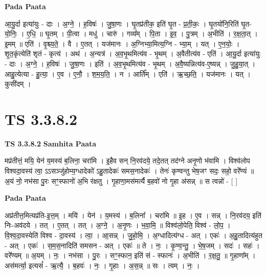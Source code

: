 \documentclass[17pt]{extarticle}
\begin{document}
\textbf{Pada Paata} \newline

आ॒यु॒र्दा इत्या॑युः - दाः । अ॒ग्ने॒ । ह॒विषः॑ । जु॒षा॒णः । घृ॒तप्र॑तीक॒ इति॑ घृ॒त - प्र॒ती॒कः॒ । घृ॒तयो॑नि॒रिति॑ घृ॒त-यो॒निः॒ । ए॒धि॒ ॥ घृ॒तम् । पी॒त्वा । मधु॑ । चारु॑ । गव्य᳚म् । पि॒ता । इ॒व॒ । पु॒त्रम् । अ॒भीति॑ । र॒क्ष॒ता॒त् । इ॒मम् ॥ एति॑ । वृ॒श्च्य॒ते॒ । वै । ए॒तत् । यज॑मानः । अ॒ग्निभ्या॒मित्य॒ग्नि - भ्या॒म् । यत् । ए॒न॒योः॒ । शृ॒त॒कृंत्येति॑ शृतं - कृत्य॑ । अथ॑ । अ॒न्यत्र॑ । अ॒व॒भृ॒थमित्य॑व - भृ॒थम् । अ॒वैतीत्य॑व - एति॑ । आ॒यु॒र्दा इत्या॑युः - दाः । अ॒ग्ने॒ । ह॒विषः॑ । जु॒षा॒णः । इति॑ । अ॒व॒भृ॒थमित्य॑व - भृ॒थम् । अ॒वै॒ष्यन्नित्य॑व-ए॒ष्यन्न् । जु॒हु॒या॒त् । आहु॒त्येत्या - हु॒त्या॒ । ए॒व । ए॒नौ॒ । श॒म॒य॒ति॒ । न । आर्ति᳚म् । एति॑ । ऋ॒च्छ॒ति॒ । यज॑मानः । यत् । कुसी॑दम् ।  \newline





\section{ TS 3.3.8.2 }

\textbf{TS 3.3.8.2 } \newline
\textbf{Samhita Paata} \newline

मप्र॑तीत्तं॒ मयि॒ येन॑ य॒मस्य॑ ब॒लिना॒ चरा॑मि । इ॒हैव सन् नि॒रव॑दये॒ तदे॒तत् तद॑ग्ने अनृ॒णो भ॑वामि । विश्व॑लोप विश्वदा॒वस्य॑ त्वा॒ ऽऽसञ्जु॑होम्य॒ग्धादेको॑ ऽहु॒तादेकः॑ समस॒नादेकः॑ । तेनः॑ कृण्वन्तु भेष॒जꣳ सदः॒ सहो॒ वरे᳚ण्यं ॥ अ॒यं नो॒ नभ॑सा पु॒रः सꣳ॒॒स्फानो॑ अ॒भि र॑क्षतु । गृ॒हाणा॒मस॑मर्त्यै ब॒हवो॑ नो गृ॒हा अ॑सन्न् ॥ स त्वन्नो॑ - [  ] \newline

\textbf{Pada Paata} \newline

अप्र॑तीत्त॒मित्यप्र॑ति-इ॒त्त॒म् । मयि॑ । येन॑ । य॒मस्य॑ । ब॒लिना᳚ । चरा॑मि ॥ इ॒ह । ए॒व । सन्न् । नि॒रव॑दय॒ इति॑ निः-अव॑दये । तत् । ए॒तत् । तत् । अ॒ग्ने॒ । अ॒नृ॒णः । भ॒वा॒मि॒ ॥ विश्व॑लो॒पेति॒ विश्व॑ - लो॒प॒ । वि॒श्व॒दा॒वस्येति॑ विश्व - दा॒वस्य॑ । त्वा॒ । आ॒सन्न् । जु॒हो॒मि॒ । अ॒ग्धादित्य॑ग्ध - अत् । एकः॑ । अ॒हु॒तादित्य॑हुत - अत् । एकः॑ । स॒म॒स॒नादिति॑ समसन - अत् । एकः॑ ॥ ते । नः॒ । कृ॒ण्व॒न्तु॒ । भे॒ष॒जम् । सदः॑ । सहः॑ । वरे᳚ण्यम् ॥ अ॒यम् । नः॒ । नभ॑सा । पु॒रः । सꣳ॒॒स्फान॒ इति॑ सं - स्फानः॑ । अ॒भीति॑ । र॒क्ष॒तु॒ ॥ गृ॒हाणा᳚म् । अस॑मर्त्या॒ इत्यसं᳚ - ऋ॒त्यै॒ । ब॒हवः॑ । नः॒ । गृ॒हाः । अ॒स॒न्न् ॥ सः । त्वम् । नः॒ ।  \newline
\end{document}
